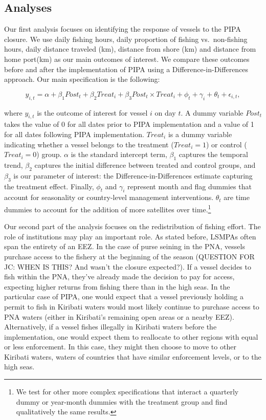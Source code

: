 \documentclass[11pt,english]{article}
\begin{document}
\subsection{Analyses}\label{analyses}

Our first analysis focuses on identifying the response of 
vessels to the PIPA closure. We use daily fishing hours, daily proportion of fishing vs.~non-fishing
hours, daily distance traveled (km), distance from shore (km) and
distance from home
port(km) as our main outcomes of interest.
We compare these outcomes before and after the implementation
of PIPA using a Difference-in-Differences approach. Our main
specification is the following:

\[
y_{i,t} = \alpha + \beta_1 Post_t + \beta_2 Treat_i + \beta_3 Post_t \times Treat_i + \phi_t + \gamma_i + \theta_t + \epsilon_{i,t},
\]

where \(y_{i,t}\) is the outcome of interest for vessel \(i\) on day \(t\). A dummy variable \(Post_t\) takes the value of 0 for all
dates prior to PIPA implementation and a value of 1 for all dates
following PIPA implementation. \(Treat_i\) is a dummy
variable indicating whether a vessel belongs to the treatment (\(Treat_i = 1\)) or control
(\(Treat_i = 0\)) group. \(\alpha\) is
the standard intercept term, \(\beta_1\) captures the temporal trend,
\(\beta_2\) captures the initial difference between treated and control groups,
and \(\beta_3\) is our parameter of interest: the Difference-in-Differences estimate capturing
the treatment effect. Finally, \(\phi_t\) and \(\gamma_i\) represent
month and flag dummies that account for seasonality or
country-level management interventions. \(\theta_t\) are time dummies to
account for the addition of more satellites over time.\footnote{We test for other more complex specifications that interact a quarterly dummy or year-month dummies with the treatment group and find qualitatively the same results.}

Our second part of the analysis focuses on the redistribution of fishing
effort. The role of institutions may play an important role. As stated
before, LSMPAs often span the entirety of an EEZ. In the case of purse
seining in the PNA, vessels purchase access to the fishery at the
beginning of the season (QUESTION FOR JC: WHEN IS THIS? And wasn't the closure expected?). If a vessel decides to fish within the PNA,
they've already made the decision to pay for access, expecting higher
returns from fishing there than in the high seas. In the particular case
of PIPA, one would expect that a vessel previously holding a permit to fish in
Kiribati waters would 
most likely continue to purchase access to PNA waters (either in Kiribati's remaining open areas or a nearby EEZ). Alternatively, if a vessel fishes illegally
in Kiribati waters before the implementation, one would expect them to
reallocate to other regions with equal or less enforcement. In this
case, they might then choose to move to other Kiribati waters, waters
of countries that have similar enforcement levels, or to the high seas.
\end{document}
